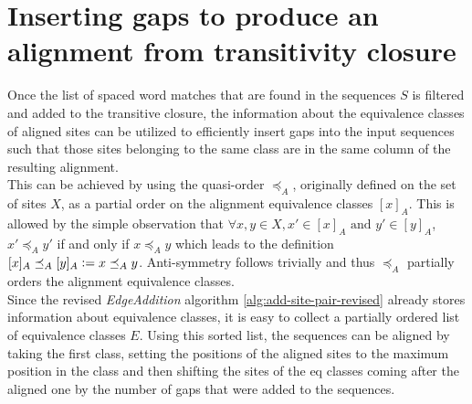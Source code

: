\section{Inserting gaps to produce an alignment from transitivity closure}
Once the list of spaced word matches that are found in the sequences $S$ is filtered and added to the transitive closure, the information about the equivalence classes of aligned sites can be utilized to efficiently insert gaps into the input sequences such that those sites belonging to the same class are in the same column of the resulting alignment.\\
This can be achieved by using the quasi-order $\preceq_{A}$, originally defined on the set of sites $X$, as a partial order on the alignment equivalence classes $[x]_A$. This is allowed by the simple observation that $\forall x, y \in X, x' \in [x]_A \text{ and } y' \in [y]_A$, $x' \preceq_A y'$ if and only if $x \preceq_A y$ which leads to the definition $[x]_A \preceq_A [y]_A \vcentcolon= x \preceq_A y$. Anti-symmetry follows trivially and thus $\preceq_A$ partially orders the alignment equivalence classes.\\
Since the revised \textit{EdgeAddition} algorithm \ref{alg:add-site-pair-revised} already stores information about equivalence classes, it is easy to collect a partially ordered list of equivalence classes $E$. Using this sorted list, the sequences can be aligned by taking the first class, setting the positions of the aligned sites to the maximum position in the class and then shifting the sites of the eq classes coming after the aligned one by the number of gaps that were added to the sequences.  
